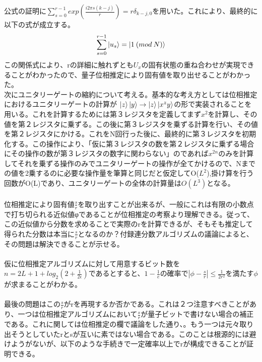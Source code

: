 \documentclass[a4paper,10.5pt]{article}
\numberwithin{equation}{section}
\begin{document}
公式の証明に$\sum_{s=0}^{r-1}exp(\frac{i2\pi s (k-j)}{r})=r\delta_{k-j,0}$を用いた。これにより、最終的に以下の式が成立する。
\begin{equation}\begin{split}
    \sum_{s=0}^{r-1} \ket{u_{s}}=\ket{1\:(mod\:N)}
\end{split} \end{equation}
この関係式により、rの詳細に触れずとも$U_{x}$の固有状態の重ね合わせが実現できることがわかったので、量子位相推定により固有値を取り出せることがわかった。\\
次にユニタリーゲートの縮約について考える。基本的な考え方としては位相推定におけるユニタリーゲートの計算が
$\ket{z}\ket{y} \to \ket{z}\ket{x^{z}y}$の形で実装されることを用いる。これを計算するためには第３レジスタを定義してまず$x^{2}$を計算し、その値を第２レジスタに乗ずる。この後に第３レジスタを乗ずる計算を行い、その値を第２レジスタにかける。これをN回行った後に、最終的に第３レジスタを初期化する。この操作により、「仮に第３レジスタの数を第２レジスタに乗ずる場合にその操作の数が第３レジスタの数字に関わらない」のであれば$x^{2n}$のみを計算してそれを乗ずる操作のみでユニタリーゲートの操作が全てかけるので、Nまでの値を2乗するのに必要な操作量を筆算と同じだと仮定してO($L^{2}$),掛け算を行う回数がO(L)であり、ユニタリーゲートの全体の計算量は$O(L^{3})$となる。\\
\\
位相推定により固有値$\frac{s}{r}$を取り出すことが出来るが、一般にこれは有限の小数点で打ち切られる近似値φであることが位相推定の考察より理解できる。従って、この近似値から分数を求めることで実際のrを計算できるが、そもそも推定して得られた分数は本当に$\frac{s}{r}$となるのか？付録連分数アルゴリズムの議論によると、その問題は解決できることが示せる。\\
\\
仮に位相推定アルゴリズムに対して用意するビット数を$n=2L+1+log_{2}(2+\frac{1}{2\epsilon})$であるとすると、$1-\frac{1}{e}$の確率で$|\phi -\frac{s}{r}|\leq \frac{1}{2r^{2}}$を満たす$\phi$が求まることがわかる。\\
\\
最後の問題はこの$\frac{s}{r}$がrを再現するか否かである。これは２つ注意すべきことがあり、一つは位相推定アルゴリズムにおいて$\frac{s}{r}$が量子ビットで書けない場合の補正である。これに関しては位相推定の欄で議論をした通り、。もう一つは元々取り出そうとしていたrとsが互いに素ではない場合である。このことは根源的には避けようがないが、以下のような手続きで一定確率以上でrが構成できることが証明できる。\\
\\
\end{document}

